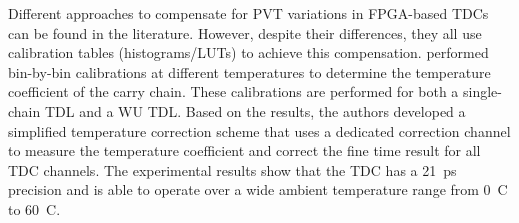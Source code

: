 Different approaches to compensate for \gls{PVT} variations in \gls{FPGA}-based \glspl{TDC} can be found in the literature. However, despite their differences, they all use calibration tables (histograms/\glspl{LUT}) to achieve this compensation. \citet{temperature_coeffients} performed bin-by-bin calibrations at different temperatures to determine the temperature coefficient of the carry chain. These calibrations are performed for both a single-chain \gls{TDL} and a \gls{WU} \gls{TDL}. Based on the results, the authors developed a simplified temperature correction scheme that uses a dedicated correction channel to measure the temperature coefficient and correct the fine time result for all \gls{TDC} channels. The experimental results show that the \gls{TDC} has a 21~ps precision and is able to operate over a wide ambient temperature range from 0~\textdegree C to 60~\textdegree C.

